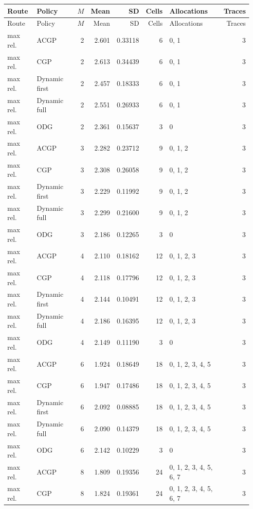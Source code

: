 \documentclass[10pt,a4paper]{article}
\begin{document}
\tiny\setlength{\tabcolsep}{2pt}\begin{longtable}{@{}p{23mm}p{29mm}rrrrp{36mm}r@{}}
\toprule Route & Policy & $M$ & Mean & SD & Cells & Allocations & Traces \\ \midrule\endfirsthead
\toprule Route & Policy & $M$ & Mean & SD & Cells & Allocations & Traces \\ \midrule\endhead
\bottomrule\endfoot
max rel. & ACGP & 2 & 2.601 & 0.33118 & 6 & 0, 1 & 3 \\
max rel. & CGP & 2 & 2.613 & 0.34439 & 6 & 0, 1 & 3 \\
max rel. & Dynamic first & 2 & 2.457 & 0.18333 & 6 & 0, 1 & 3 \\
max rel. & Dynamic full & 2 & 2.551 & 0.26933 & 6 & 0, 1 & 3 \\
max rel. & ODG & 2 & 2.361 & 0.15637 & 3 & 0 & 3 \\
max rel. & ACGP & 3 & 2.282 & 0.23712 & 9 & 0, 1, 2 & 3 \\
max rel. & CGP & 3 & 2.308 & 0.26058 & 9 & 0, 1, 2 & 3 \\
max rel. & Dynamic first & 3 & 2.229 & 0.11992 & 9 & 0, 1, 2 & 3 \\
max rel. & Dynamic full & 3 & 2.299 & 0.21600 & 9 & 0, 1, 2 & 3 \\
max rel. & ODG & 3 & 2.186 & 0.12265 & 3 & 0 & 3 \\
max rel. & ACGP & 4 & 2.110 & 0.18162 & 12 & 0, 1, 2, 3 & 3 \\
max rel. & CGP & 4 & 2.118 & 0.17796 & 12 & 0, 1, 2, 3 & 3 \\
max rel. & Dynamic first & 4 & 2.144 & 0.10491 & 12 & 0, 1, 2, 3 & 3 \\
max rel. & Dynamic full & 4 & 2.186 & 0.16395 & 12 & 0, 1, 2, 3 & 3 \\
max rel. & ODG & 4 & 2.149 & 0.11190 & 3 & 0 & 3 \\
max rel. & ACGP & 6 & 1.924 & 0.18649 & 18 & 0, 1, 2, 3, 4, 5 & 3 \\
max rel. & CGP & 6 & 1.947 & 0.17486 & 18 & 0, 1, 2, 3, 4, 5 & 3 \\
max rel. & Dynamic first & 6 & 2.092 & 0.08885 & 18 & 0, 1, 2, 3, 4, 5 & 3 \\
max rel. & Dynamic full & 6 & 2.090 & 0.14379 & 18 & 0, 1, 2, 3, 4, 5 & 3 \\
max rel. & ODG & 6 & 2.142 & 0.10229 & 3 & 0 & 3 \\
max rel. & ACGP & 8 & 1.809 & 0.19356 & 24 & 0, 1, 2, 3, 4, 5, 6, 7 & 3 \\
max rel. & CGP & 8 & 1.824 & 0.19361 & 24 & 0, 1, 2, 3, 4, 5, 6, 7 & 3 \\

\end{longtable}
\end{document}
